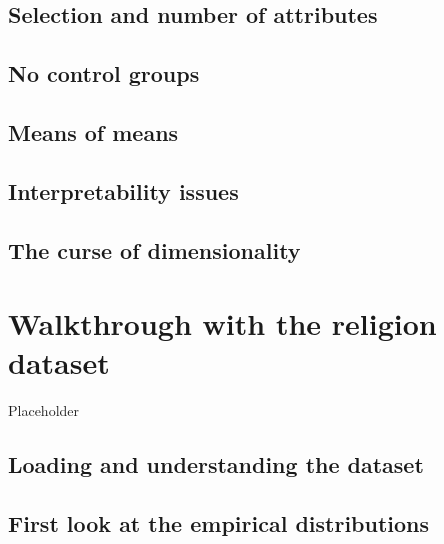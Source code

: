 \documentclass[
  12pt,
]{book}
\begin{document}
\hypertarget{selection-and-number-of-attributes}{%
\section{Selection and number of attributes}\label{selection-and-number-of-attributes}}

\hypertarget{no-control-groups}{%
\section{No control groups}\label{no-control-groups}}

\hypertarget{means-of-means}{%
\section{Means of means}\label{means-of-means}}

\hypertarget{interpretability-issues}{%
\section{Interpretability issues}\label{interpretability-issues}}

\hypertarget{the-curse-of-dimensionality}{%
\section{The curse of dimensionality}\label{the-curse-of-dimensionality}}

\hypertarget{walkthrough-with-the-religion-dataset}{%
\chapter{Walkthrough with the religion dataset}\label{walkthrough-with-the-religion-dataset}}

Placeholder

\hypertarget{loading-and-understanding-the-dataset}{%
\section{Loading and understanding the dataset}\label{loading-and-understanding-the-dataset}}

\hypertarget{first-look-at-the-empirical-distributions}{%
\section{First look at the empirical distributions}\label{first-look-at-the-empirical-distributions}}
\end{document}
